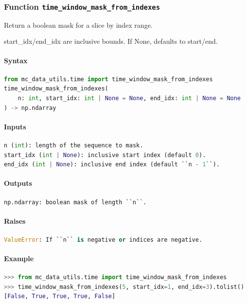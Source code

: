 \documentclass[11pt]{article}
\begin{document}
\subsubsection{Function \texttt{time\_window\_mask\_from\_indexes}}
Return a boolean mask for a slice by index range.

start\_idx/end\_idx are inclusive bounds. If None, defaults to start/end.

\paragraph{Syntax}
\begin{lstlisting}[language=Python]
from mc_data_utils.time import time_window_mask_from_indexes
time_window_mask_from_indexes(
    n: int, start_idx: int | None = None, end_idx: int | None = None
) -> np.ndarray
\end{lstlisting}
\paragraph{Inputs}
\begin{lstlisting}[language=Python]
n (int): length of the sequence to mask.
start_idx (int | None): inclusive start index (default 0).
end_idx (int | None): inclusive end index (default ``n - 1``).
\end{lstlisting}
\paragraph{Outputs}
\begin{lstlisting}[language=Python]
np.ndarray: boolean mask of length ``n``.
\end{lstlisting}
\paragraph{Raises}
\begin{lstlisting}[language=Python]
ValueError: If ``n`` is negative or indices are negative.
\end{lstlisting}
\paragraph{Example}
\begin{lstlisting}[language=Python]
>>> from mc_data_utils.time import time_window_mask_from_indexes
>>> time_window_mask_from_indexes(5, start_idx=1, end_idx=3).tolist()
[False, True, True, True, False]
\end{lstlisting}
\end{document}
